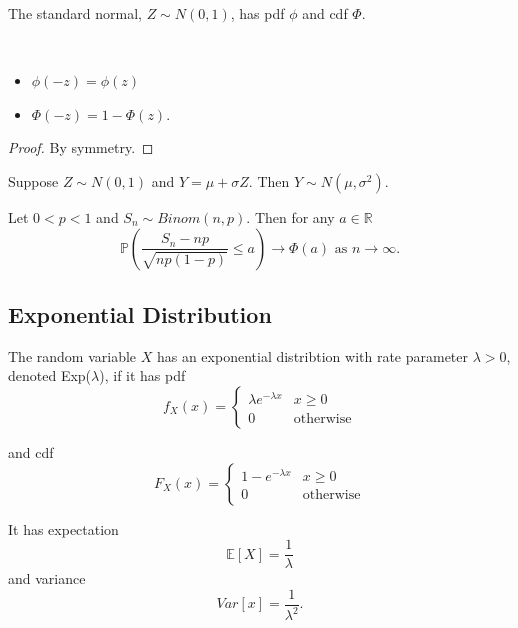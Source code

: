 The standard normal, $Z \sim N(0, 1)$, has pdf $\phi$ and cdf $\Phi$.

\begin{lemma} $ $
  \begin{itemize}
    \item $\phi(-z) = \phi(z)$
    \item $\Phi(-z) = 1 - \Phi(z).$
  \end{itemize}
\end{lemma}
\begin{proof}
    By symmetry.
\end{proof}

\begin{prop}
    Suppose $Z \sim N(0,1)$ and $Y = \mu + \sigma Z$. Then $Y \sim N(\mu, \sigma^2)$.
\end{prop}

\begin{theorem}
    Let $0 < p < 1$ and $S_n \sim Binom(n, p)$. Then for any $a \in \mathbb{R}$
    \[\mathbb{P}\left(\frac{S_n - np}{\sqrt{np(1 - p)}} \leq a\right) \rightarrow \Phi(a) \text{ as } n \rightarrow \infty .\]

\end{theorem}

\subsection{Exponential Distribution}

\begin{definition}
    The random variable $X$ has an exponential distribtion with rate parameter $\lambda > 0$, denoted Exp($\lambda$), if it has pdf
    \[
      f_X(x) = \left\{\begin{array}{lr}
          \lambda e^{-\lambda x} & x \geq 0\\
          0 & \text{otherwise}
      \end{array}\right.
    \]
    
    and cdf
    \[
      F_X(x) = \left\{\begin{array}{lr}
          1 - e^{- \lambda x} & x \geq 0\\
          0 & \text{otherwise}
      \end{array}\right.
    \]
    
    It has expectation
    \[\mathbb{E}[X] = \frac{1}{\lambda}\]
    and variance
    \[ Var[x] = \frac{1}{\lambda^2}.\]
        
\end{definition}

